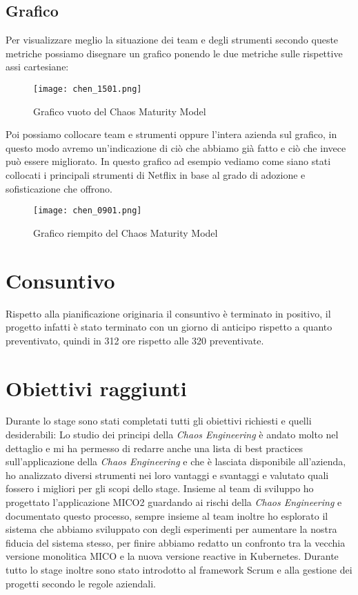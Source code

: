 \subsection{Grafico}
Per visualizzare meglio la situazione dei team e degli strumenti secondo queste metriche possiamo disegnare un grafico ponendo le due metriche sulle rispettive assi cartesiane:
\begin{figure}[H]
    \centering
    \texttt{[image: chen\_1501.png]}
    \label{tab:grafico-vuoto-cmm}
    \caption{Grafico vuoto del Chaos Maturity Model}
\end{figure}
Poi possiamo collocare team e strumenti oppure l'intera azienda sul grafico, in questo modo avremo un'indicazione di ciò che abbiamo già fatto e ciò che invece può essere migliorato.
In questo grafico ad esempio vediamo come siano stati collocati i principali strumenti di Netflix in base al grado di adozione e sofisticazione che offrono.
\begin{figure}[H]
    \centering
    \texttt{[image: chen\_0901.png]}
    \label{tab:grafico-vuoto-cmm}
    \caption{Grafico riempito del Chaos Maturity Model}
\end{figure}

\section{Consuntivo}
Rispetto alla pianificazione originaria il consuntivo è terminato in positivo, il progetto infatti è stato terminato con un giorno di anticipo rispetto a quanto preventivato, quindi in 312 ore rispetto alle 320 preventivate.

\section{Obiettivi raggiunti}
Durante lo stage sono stati completati tutti gli obiettivi richiesti e quelli desiderabili: Lo studio dei principi della \textit{Chaos Engineering} è andato molto nel dettaglio e mi ha permesso di redarre anche una lista di best practices sull'applicazione della \textit{Chaos Engineering} e che è lasciata disponibile all'azienda, ho analizzato diversi strumenti nei loro vantaggi e svantaggi e valutato quali fossero i migliori per gli scopi dello stage.
Insieme al team di sviluppo ho progettato l'applicazione MICO2 guardando ai rischi della \textit{Chaos Engineering} e documentato questo processo, sempre insieme al team inoltre ho esplorato il sistema che abbiamo sviluppato con degli esperimenti per aumentare la nostra fiducia del sistema stesso, per finire abbiamo redatto un confronto tra la vecchia versione monolitica MICO e la nuova versione reactive in Kubernetes.
Durante tutto lo stage inoltre sono stato introdotto al framework Scrum e alla gestione dei progetti secondo le regole aziendali.

